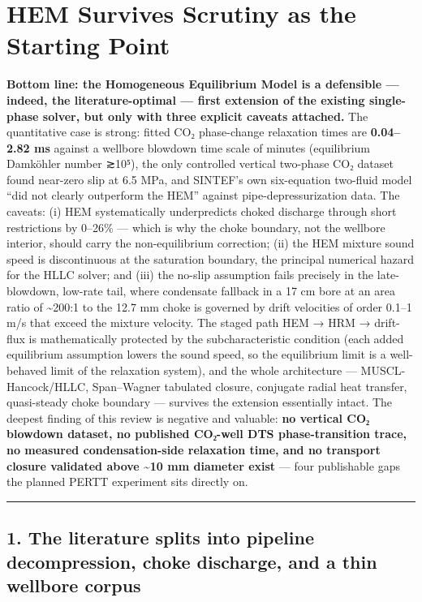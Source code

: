 \hypertarget{hem-survives-scrutiny-as-the-starting-point}{%
\section{HEM Survives Scrutiny as the Starting
Point}\label{hem-survives-scrutiny-as-the-starting-point}}

\textbf{Bottom line: the Homogeneous Equilibrium Model is a defensible
--- indeed, the literature-optimal --- first extension of the existing
single-phase solver, but only with three explicit caveats attached.} The
quantitative case is strong: fitted CO₂ phase-change relaxation times
are \textbf{0.04--2.82 ms} against a wellbore blowdown time scale of
minutes (equilibrium Damköhler number ≳10⁵), the only controlled
vertical two-phase CO₂ dataset found near-zero slip at 6.5 MPa, and
SINTEF's own six-equation two-fluid model ``did not clearly outperform
the HEM'' against pipe-depressurization data. The caveats: (i) HEM
systematically underpredicts choked discharge through short restrictions
by 0--26\% --- which is why the choke boundary, not the wellbore
interior, should carry the non-equilibrium correction; (ii) the HEM
mixture sound speed is discontinuous at the saturation boundary, the
principal numerical hazard for the HLLC solver; and (iii) the no-slip
assumption fails precisely in the late-blowdown, low-rate tail, where
condensate fallback in a 17 cm bore at an area ratio of
\textasciitilde200:1 to the 12.7 mm choke is governed by drift
velocities of order 0.1--1 m/s that exceed the mixture velocity. The
staged path HEM → HRM → drift-flux is mathematically protected by the
subcharacteristic condition (each added equilibrium assumption lowers
the sound speed, so the equilibrium limit is a well-behaved limit of the
relaxation system), and the whole architecture --- MUSCL-Hancock/HLLC,
Span--Wagner tabulated closure, conjugate radial heat transfer,
quasi-steady choke boundary --- survives the extension essentially
intact. The deepest finding of this review is negative and valuable:
\textbf{no vertical CO₂ blowdown dataset, no published CO₂-well DTS
phase-transition trace, no measured condensation-side relaxation time,
and no transport closure validated above \textasciitilde10 mm diameter
exist} --- four publishable gaps the planned PERTT experiment sits
directly on.

\begin{center}\rule{0.5\linewidth}{0.5pt}\end{center}

\hypertarget{the-literature-splits-into-pipeline-decompression-choke-discharge-and-a-thin-wellbore-corpus}{%
\subsection{1. The literature splits into pipeline decompression, choke
discharge, and a thin wellbore
corpus}\label{the-literature-splits-into-pipeline-decompression-choke-discharge-and-a-thin-wellbore-corpus}}

